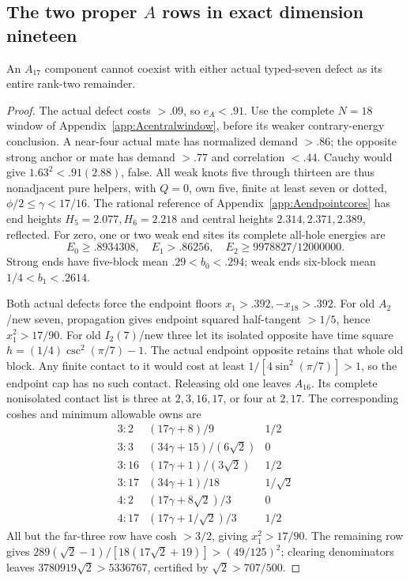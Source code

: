 \subsection{The two proper $A$ rows in exact dimension nineteen}
\begin{lemma}\label{app:tail:lem:A17typed}
An $A_{17}$ component cannot coexist with either actual typed-seven
defect as its entire rank-two remainder.
\end{lemma}
\begin{proof}
The actual defect costs $>.09$, so $e_A<.91$. Use the complete
$N=18$ window of Appendix~\ref{app:Acentralwindow}, before its
weaker contrary-energy conclusion. A near-four actual mate has
normalized demand $>.86$; the opposite strong anchor or mate
has demand $>.77$ and correlation $<.44$.
Cauchy would give $1.63^2<.91(2.88)$, false.
All weak knots five through thirteen are thus nonadjacent pure
helpers, with $Q=0$, own five, finite at least seven or dotted,
$\phi/2\le\gamma<17/16$.
The rational reference of Appendix~\ref{app:Aendpointcores}
has end heights $H_5=2.077,H_6=2.218$ and central heights
$2.314,2.371,2.389$, reflected. For zero, one or two weak end
sites its complete all-hole energies are
\[
 E_0\ge.8934308,\quad E_1>.86256,\quad
 E_2\ge9978827/12000000.
\]
Strong ends have five-block mean $.29<b_0<.294$;
weak ends six-block mean $1/4<b_1<.2614$.

Both actual defects force the endpoint floors
$x_1>.392,-x_{18}>.392$.
For old $A_2$/new seven, propagation gives endpoint squared
half-tangent $>1/5$, hence $x_1^2>17/90$.
For old $I_2(7)$/new three let its isolated opposite have
time square $h=(1/4)\csc^2(\pi/7)-1$.
The actual endpoint opposite retains that whole old block.
Any finite contact to it would cost at least
$1/[4\sin^2(\pi/7)]>1$, so the endpoint cap has no such contact.
Releasing old one leaves $A_{16}$. Its complete nonisolated
contact list is three at $2,3,16,17$, or four at $2,17$.
The corresponding coshes and minimum allowable owns are
\[
\begin{array}{c|c|c}
3:2&(17\gamma+8)/9&1/2\\
3:3&(34\gamma+15)/(6\sqrt2)&0\\
3:16&(17\gamma+1)/(3\sqrt2)&1/2\\
3:17&(34\gamma+1)/18&1/\sqrt2\\
4:2&(17\gamma+8\sqrt2)/3&0\\
4:17&(17\gamma+1/\sqrt2)/3&1/2
\end{array}
\]
All but the far-three row have cosh $>3/2$, giving
$x_1^2>17/90$. The remaining row gives
$289(\sqrt2-1)/[18(17\sqrt2+19)]>(49/125)^2$;
clearing denominators leaves
$3780919\sqrt2>5336767$, certified by $\sqrt2>707/500$.


\end{proof}
